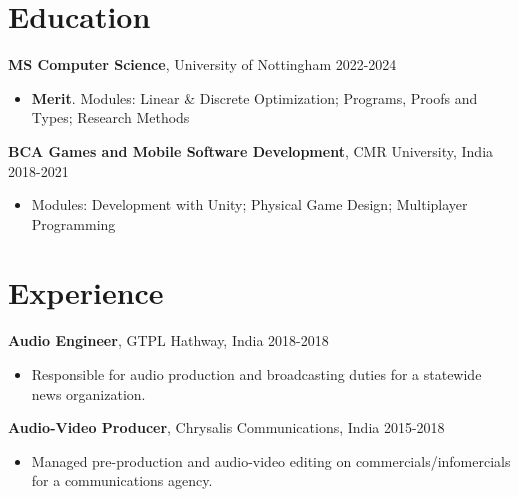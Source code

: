 \documentclass[11pt,a4paper]{article}
\begin{document}
\section{Education}
\vspace{1pt}

\noindent \textbf{MS Computer Science}, University of Nottingham \hfill 2022-2024
\begin{itemize}
\item \textbf{Merit}. Modules: Linear \& Discrete Optimization; Programs, Proofs and Types; Research Methods
\end{itemize}
\vspace{8pt}

\noindent \textbf{BCA Games and Mobile Software Development}, CMR University, India \hfill 2018-2021
\begin{itemize}
\item Modules: Development with Unity; Physical Game Design; Multiplayer Programming
\end{itemize}

\section{Experience}
\vspace{1pt}

\noindent \textbf{Audio Engineer}, GTPL Hathway, India \hfill 2018-2018
\begin{itemize}
\item Responsible for audio production and broadcasting duties for a statewide news organization.
\end{itemize}
\vspace{8pt}

\noindent \textbf{Audio-Video Producer}, Chrysalis Communications, India \hfill 2015-2018
\begin{itemize}
\item Managed pre-production and audio-video editing on commercials/infomercials for a communications agency.
\end{itemize}
\end{document}
